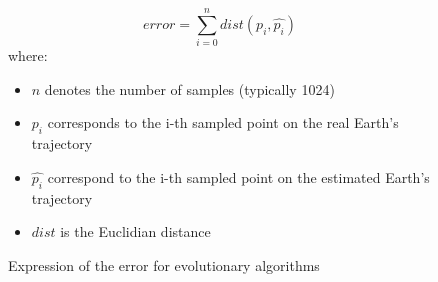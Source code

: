\begin{figure}
    \[ error = \sum_{i=0}^{n} dist(p_{i}, \hat{p_{i}}) \]
    where:
    \begin{itemize}
        \item \(n\) denotes the number of samples (typically 1024)
        \item \(p_{i}\) corresponds to the i-th sampled point on the real
              Earth's
              trajectory
        \item \(\hat{p_{i}}\) correspond to the i-th sampled point on the
              estimated
              Earth's trajectory
        \item \(dist\) is the Euclidian distance
    \end{itemize}
    \caption{Expression of the error for evolutionary algorithms}
    \label{error_1}
\end{figure}



